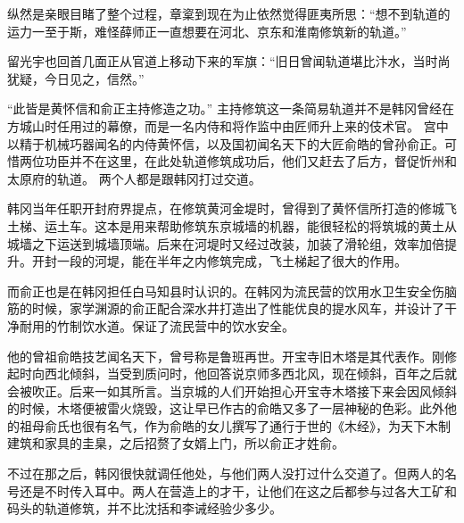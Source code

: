 纵然是亲眼目睹了整个过程，章楶到现在为止依然觉得匪夷所思：“想不到轨道的运力一至于斯，难怪薛师正一直想要在河北、京东和淮南修筑新的轨道。”

留光宇也回首几面正从官道上移动下来的军旗：“旧日曾闻轨道堪比汴水，当时尚犹疑，今日见之，信然。”

“此皆是黄怀信和俞正主持修造之功。”
主持修筑这一条简易轨道并不是韩冈曾经在方城山时任用过的幕僚，而是一名内侍和将作监中由匠师升上来的伎术官。
宫中以精于机械巧器闻名的内侍黄怀信，以及国初闻名天下的大匠俞皓的曾孙俞正。可惜两位功臣并不在这里，在此处轨道修筑成功后，他们又赶去了后方，督促忻州和太原府的轨道。
两个人都是跟韩冈打过交道。

韩冈当年任职开封府界提点，在修筑黄河金堤时，曾得到了黄怀信所打造的修城飞土梯、运土车。这本是用来帮助修筑东京城墙的机器，能很轻松的将筑城的黄土从城墙之下运送到城墙顶端。后来在河堤时又经过改装，加装了滑轮组，效率加倍提升。开封一段的河堤，能在半年之内修筑完成，飞土梯起了很大的作用。

而俞正也是在韩冈担任白马知县时认识的。在韩冈为流民营的饮用水卫生安全伤脑筋的时候，家学渊源的俞正配合深水井打造出了性能优良的提水风车，并设计了干净耐用的竹制饮水道。保证了流民营中的饮水安全。

他的曾祖俞皓技艺闻名天下，曾号称是鲁班再世。开宝寺旧木塔是其代表作。刚修起时向西北倾斜，当受到质问时，他回答说京师多西北风，现在倾斜，百年之后就会被吹正。后来一如其所言。当京城的人们开始担心开宝寺木塔接下来会因风倾斜的时候，木塔便被雷火烧毁，这让早已作古的俞皓又多了一层神秘的色彩。此外他的祖母俞氏也很有名气，作为俞皓的女儿撰写了通行于世的《木经》，为天下木制建筑和家具的圭臬，之后招赘了女婿上门，所以俞正才姓俞。

不过在那之后，韩冈很快就调任他处，与他们两人没打过什么交道了。但两人的名号还是不时传入耳中。两人在营造上的才干，让他们在这之后都参与过各大工矿和码头的轨道修筑，并不比沈括和李诫经验少多少。
